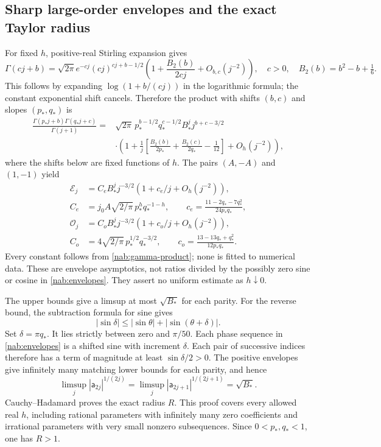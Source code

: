 \subsection{Sharp large-order envelopes and the exact Taylor radius}

For fixed $h$, positive-real Stirling expansion
\cite[\S5.11(i), (5.11.1), (5.11.3)]{askeyRoyDLMF5} gives
\[
 \Gamma(cj+b)=\sqrt{2\pi}e^{-cj}(cj)^{cj+b-1/2}
       \left(1+\frac{B_2(b)}{2cj}+O_{b,c}(j^{-2})\right),
 \quad c>0,\quad B_2(b)=b^2-b+\tfrac16.
\]
This follows by expanding $\log(1+b/(cj))$ in the logarithmic formula;
the constant exponential shift cancels. Therefore the product with
shifts $(b,c)$ and slopes $(p_*,q_*)$ is
\begin{equation}\label{nab:gamma-product}
 \begin{split}
 \frac{\Gamma(p_*j+b)\Gamma(q_*j+c)}{\Gamma(j+1)}
 ={}&\sqrt{2\pi}\,p_*^{b-1/2}q_*^{c-1/2}
             B_*^j j^{b+c-3/2}\\
 &\cdot\left(1+\frac1j\left[
       \frac{B_2(b)}{2p_*}+\frac{B_2(c)}{2q_*}-\frac1{12}
                  \right]+O_h(j^{-2})\right),
 \end{split}
\end{equation}
where the shifts below are fixed functions of $h$. The pairs
$(A,-A)$ and $(1,-1)$ yield
\begin{equation}\label{nab:sharp-envelopes}
 \begin{split}
 \mathcal E_j&=C_e B_*^j j^{-3/2}
                 (1+c_e/j+O_h(j^{-2})),\\
 C_e&=j_0A\sqrt{2/\pi}\,p_*^h q_*^{-1-h},\qquad
 c_e=\frac{11-2q_*-7q_*^2}{24p_*q_*},\\
 \mathcal O_j&=C_o B_*^j j^{-3/2}
                 (1+c_o/j+O_h(j^{-2})),\\
 C_o&=4\sqrt{2/\pi}\,p_*^{1/2}q_*^{-3/2},\qquad
 c_o=\frac{13-13q_*+q_*^2}{12p_*q_*}.
 \end{split}
\end{equation}
Every constant follows from \eqref{nab:gamma-product}; none is fitted
to numerical data. These are envelope asymptotics, not ratios divided
by the possibly zero sine or cosine in \eqref{nab:envelopes}. They
assert no uniform estimate as $h\downarrow0$.

The upper bounds give a limsup at most $\sqrt{B_*}$ for each parity.
For the reverse bound, the subtraction formula for sine gives
\[
 |\sin\delta|\leq|\sin\theta|+|\sin(\theta+\delta)|.
\]
Set $\delta=\pi q_*$. It lies strictly between zero and $\pi/50$.
Each phase sequence in \eqref{nab:envelopes} is a shifted sine with
increment $\delta$. Each pair of successive indices therefore has a
term of magnitude at least $\sin\delta/2>0$. The positive envelopes
give infinitely many matching lower bounds for each parity, and hence
\begin{equation}\label{nab:limsups}
 \limsup_j|\mathsf a_{2j}|^{1/(2j)}
 =\limsup_j|\mathsf a_{2j+1}|^{1/(2j+1)}=\sqrt{B_*}.
\end{equation}
Cauchy--Hadamard proves the exact radius $R$. This proof covers every
allowed real $h$, including rational parameters with infinitely many
zero coefficients and irrational parameters with very small nonzero
subsequences. Since $0<p_*,q_*<1$, one has $R>1$.

